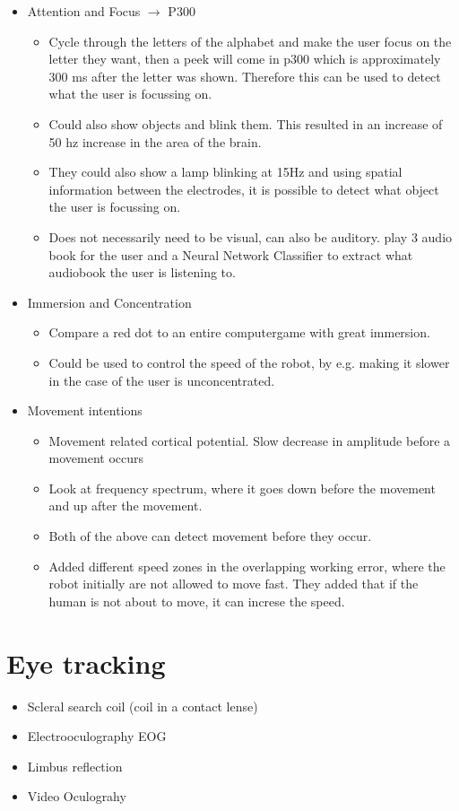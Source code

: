 \documentclass[a4paper]{article}
\begin{document}
\begin{itemize}
	\item Attention and Focus $ \rightarrow $ P300
		\begin{itemize}
			\item Cycle through the letters of the alphabet and make the user focus on the letter they want, then a peek will come in p300 which is approximately 300 ms after the letter was shown. Therefore this can be used to detect what the user is focussing on. 
			\item Could also show objects and blink them. This resulted in an increase of 50 hz increase in the area of the brain. 
			\item They could also show a lamp blinking at 15Hz and using spatial information between the electrodes, it is possible to detect what object the user is focussing on. 
			\item Does not necessarily need to be visual, can also be auditory. play 3 audio book for the user and a Neural Network Classifier to extract what audiobook the user is listening to.
		\end{itemize}
	\item Immersion and Concentration
		\begin{itemize}
			\item Compare a red dot to an entire computergame with great immersion. 
			\item Could be used to control the speed of the robot, by e.g. making it slower in the case of the user is unconcentrated. 
		\end{itemize}
	\item Movement intentions
		\begin{itemize}
			\item Movement related cortical potential. Slow decrease in amplitude before a movement occurs
			\item Look at frequency spectrum, where it goes down before the movement and up after the movement. 
			\item Both of the above can detect movement before they occur. 
			\item Added different speed zones in the overlapping working error, where the robot initially are not allowed to move fast. They added that if the human is not about to move, it can increse the speed.
		\end{itemize}
\end{itemize}


\section{Eye tracking}
\begin{itemize}
	\item Scleral search coil (coil in a contact lense)
	\item Electrooculography EOG 
	\item Limbus reflection
	\item Video Oculograhy
\end{itemize}
\end{document}
